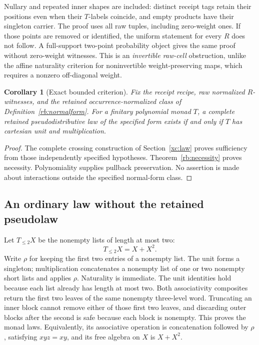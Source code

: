 \documentclass[11pt,a4paper]{article}
\newtheorem{corollary}[theorem]{Corollary}
\theoremstyle{definition}
\begin{document}
Nullary and repeated inner shapes are included: distinct receipt tags retain
their positions even when their $T$-labels coincide, and empty products
have their singleton carrier. The proof uses all raw tuples, including
zero-weight ones. If those points are removed or identified, the uniform
statement for every $R$ does not follow. A full-support two-point probability
object gives the same proof without zero-weight witnesses. This is an
\emph{invertible raw-cell} obstruction, unlike the affine naturality
criterion for noninvertible weight-preserving maps, which requires a
nonzero off-diagonal weight.

\begin{corollary}[Exact bounded criterion]\label{rb:iff}
Fix the receipt recipe, raw normalized $R$-witnesses, and the retained
occurrence-normalized class of Definition~\ref{rb:normalform}. For a
finitary polynomial monad $T$, a complete retained pseudodistributive law
of the specified form exists if and only if $T$ has cartesian unit and
multiplication.
\end{corollary}
\begin{proof}
The complete crossing construction of Section~\ref{xc:law} proves
sufficiency from those independently specified hypotheses.
Theorem~\ref{rb:necessity} proves necessity. Polynomiality supplies
pullback preservation. No assertion is made about interactions outside
the specified normal-form class.
\end{proof}

\subsection{An ordinary law without the retained pseudolaw}\label{rb:prefix}

Let $T_{\le2}X$ be the nonempty lists of length at most two:
\[
 T_{\le2}X=X+X^2.
\]
Write $\rho$ for keeping the first two entries of a nonempty list. The unit
forms a singleton; multiplication concatenates a nonempty list of one or
two nonempty short lists and applies $\rho$. Naturality is immediate.
The unit identities hold because each list already has length at most two.
Both associativity composites return the first two leaves of the same
nonempty three-level word. Truncating an inner block cannot remove either
of those first two leaves, and discarding outer blocks after the second
is safe because each block is nonempty. This proves the monad laws.
Equivalently, its associative operation is concatenation followed by
$\rho$, satisfying $xyz=xy$, and its free algebra on $X$ is $X+X^2$.
\end{document}
